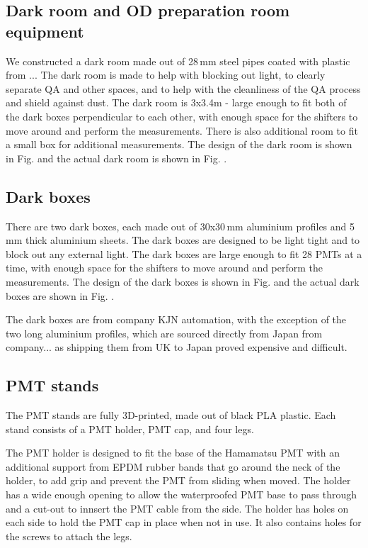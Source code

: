 \documentclass[12pt,a4paper]{article}
\begin{document}
\subsection{Dark room and OD preparation room equipment}

We constructed a dark room made out of 28\,mm steel pipes coated with plastic from ... The dark room is made to help with blocking out light, to clearly separate QA and other spaces, and to help with the cleanliness of the QA process and shield against dust. The dark room is 3x3.4m - large enough to fit both of the dark boxes perpendicular to each other, with enough space for the shifters to move around and perform the measurements. There is also additional room to fit a small box for additional measurements. The design of the dark room is shown in Fig. and the actual dark room is shown in Fig. .

\subsection{Dark boxes}
There are two dark boxes, each made out of 30x30\,mm aluminium profiles and 5\,mm thick aluminium sheets. The dark boxes are designed to be light tight and to block out any external light. The dark boxes are large enough to fit 28 PMTs at a time, with enough space for the shifters to move around and perform the measurements. The design of the dark boxes is shown in Fig. and the actual dark boxes are shown in Fig. .

The dark boxes are from company KJN automation, with the exception of the two long aluminium profiles, which are sourced directly from Japan from company... as shipping them from UK to Japan proved expensive and difficult.

\subsection{PMT stands}

The PMT stands are fully 3D-printed, made out of black PLA plastic. Each stand consists of a PMT holder, PMT cap, and four legs.

The PMT holder is designed to fit the base of the Hamamatsu PMT with an additional support from EPDM rubber bands that go around the neck of the holder, to add grip and prevent the PMT from sliding when moved. The holder has a wide enough opening to allow the waterproofed PMT base to pass through and a cut-out to innsert the PMT cable from the side. The holder has holes on each side to hold the PMT cap in place when not in use. It also contains holes for the screws to attach the legs.
\end{document}
